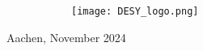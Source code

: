 \begin{titlepage}
\begin{center}
        \vfill
        
        \begin{figure}[h]
            \begin{subfigure}{0.3\textwidth}
                \centering
                \texttt{[image: DESY\_logo.png]}
            \end{subfigure}
        \end{figure}
        
        \vspace{0.5cm}
        
        Aachen, November 2024
            
    \end{center}
\end{titlepage}